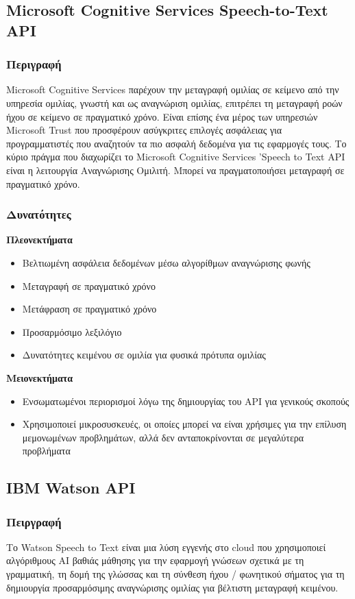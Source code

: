 \documentclass[oneside, 12pt]{book}
\begin{document}
\subsection{Microsoft Cognitive Services Speech-to-Text API}
\label{subsec:microsoft-cognitive-services-speech-to-text-api}
\subsubsection{Περιγραφή}
Microsoft Cognitive Services παρέχουν την μεταγραφή ομιλίας σε κείμενο από την υπηρεσία ομιλίας,
γνωστή και ως αναγνώριση ομιλίας, επιτρέπει τη μεταγραφή ροών ήχου σε κείμενο σε πραγματικό χρόνο.
Είναι επίσης ένα μέρος των υπηρεσιών Microsoft Trust που προσφέρουν ασύγκριτες επιλογές ασφάλειας
για προγραμματιστές που αναζητούν τα πιο ασφαλή δεδομένα για τις εφαρμογές τους.
Το κύριο πράγμα που διαχωρίζει το Microsoft Cognitive Services ’Speech to Text API είναι η
λειτουργία Αναγνώρισης Ομιλιτή.
Μπορεί να πραγματοποιήσει μεταγραφή σε πραγματικό χρόνο.
\subsubsection{Δυνατότητες}
\noindent
\textbf{Πλεονεκτήματα}
\begin{itemize}
  \item Βελτιωμένη ασφάλεια δεδομένων μέσω αλγορίθμων αναγνώρισης φωνής
  \item Μεταγραφή σε πραγματικό χρόνο
  \item Μετάφραση σε πραγματικό χρόνο
  \item Προσαρμόσιμο λεξιλόγιο
  \item Δυνατότητες κειμένου σε ομιλία για φυσικά πρότυπα ομιλίας
\end{itemize}
\textbf{Μειονεκτήματα}
\begin{itemize}
  \item Ενσωματωμένοι περιορισμοί λόγω της δημιουργίας του API για γενικούς σκοπούς
  \item Χρησιμοποιεί μικροσυσκευές, οι οποίες μπορεί να είναι χρήσιμες για την επίλυση μεμονωμένων προβλημάτων, αλλά δεν ανταποκρίνονται σε μεγαλύτερα προβλήματα
\end{itemize}
\subsection{IBM Watson API}
\label{subsec:ibm-watson}
\subsubsection{Πειργραφή}
Το Watson Speech to Text είναι μια λύση εγγενής στο cloud που χρησιμοποιεί αλγόριθμους AI βαθιάς
μάθησης για την εφαρμογή γνώσεων σχετικά με τη γραμματική, τη δομή της γλώσσας και τη σύνθεση ήχου /
φωνητικού σήματος για τη δημιουργία προσαρμόσιμης αναγνώρισης ομιλίας για βέλτιστη μεταγραφή
κειμένου.
\end{document}
